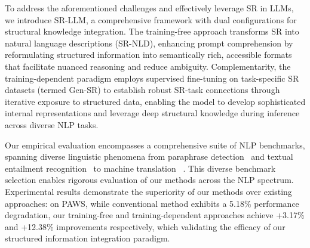 To address the aforementioned challenges and effectively leverage SR in LLMs, we introduce SR-LLM, a comprehensive framework with dual configurations for structural knowledge integration. The training-free approach transforms SR into natural language descriptions (SR-NLD), enhancing prompt comprehension by reformulating structured information into semantically rich, accessible formats that facilitate nuanced reasoning and reduce ambiguity. Complementarity, the training-dependent paradigm employs supervised fine-tuning on task-specific SR datasets (termed Gen-SR) to establish robust SR-task connections through iterative exposure to structured data, enabling the model to develop sophisticated internal representations and leverage deep structural knowledge during inference across diverse NLP tasks.


Our empirical evaluation encompasses a comprehensive suite of NLP benchmarks, spanning diverse linguistic phenomena from paraphrase detection~\citep{mihalcea2006corpus, dolan2005automatically} and textual entailment recognition~\citep{dagan2005pascal,bowman2015large} to machine translation ~\citep{bahdanau2014neural, johnson2017google}. This diverse benchmark selection enables rigorous evaluation of our methods across the NLP spectrum. Experimental results demonstrate the superiority of our methods over existing approaches: on PAWS, while conventional method exhibits a 5.18\% performance degradation, our training-free and training-dependent approaches achieve +3.17\% and +12.38\% improvements respectively, which validating the efficacy of our structured information integration paradigm.

